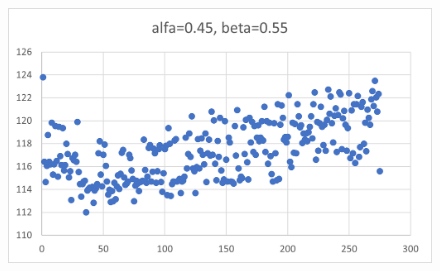 \documentclass[12pt]{mwart}
\begin{document}
	\begin{figure}[H]
		\centering
		\includegraphics{100_a0.45.png}
	\end{figure}
\end{document}
